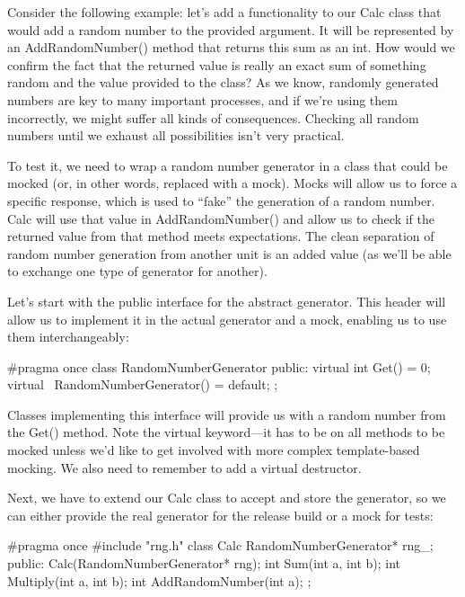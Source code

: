 Consider the following example: let’s add a functionality to our Calc class that would add a random number to the provided argument. It will be represented by an AddRandomNumber() method that returns this sum as an int. How would we confirm the fact that the returned value is really an exact sum of something random and the value provided to the class? As we know, randomly generated numbers are key to many important processes, and if we’re using them incorrectly, we might suffer all kinds of consequences. Checking all random numbers until we exhaust all possibilities isn’t very practical.


To test it, we need to wrap a random number generator in a class that could be mocked (or, in other words, replaced with a mock). Mocks will allow us to force a specific response, which is used to “fake” the generation of a random number. Calc will use that value in AddRandomNumber() and allow us to check if the returned value from that method meets expectations. The clean separation of random number generation from another unit is an added value (as we’ll be able to exchange one type of generator for another).

Let’s start with the public interface for the abstract generator. This header will allow us to implement it in the actual generator and a mock, enabling us to use them interchangeably:


\begin{cmake}
#pragma once
class RandomNumberGenerator {
    public:
    virtual int Get() = 0;
    virtual ~RandomNumberGenerator() = default;
};
\end{cmake}

Classes implementing this interface will provide us with a random number from the Get() method. Note the virtual keyword—it has to be on all methods to be mocked unless we’d like to get involved with more complex template-based mocking. We also need to remember to add a virtual destructor.

Next, we have to extend our Calc class to accept and store the generator, so we can either provide the real generator for the release build or a mock for tests:


\begin{cmake}
#pragma once
#include "rng.h"
class Calc {
    RandomNumberGenerator* rng_;
public:
    Calc(RandomNumberGenerator* rng);
    int Sum(int a, int b);
    int Multiply(int a, int b);
    int AddRandomNumber(int a);
};
\end{cmake}

